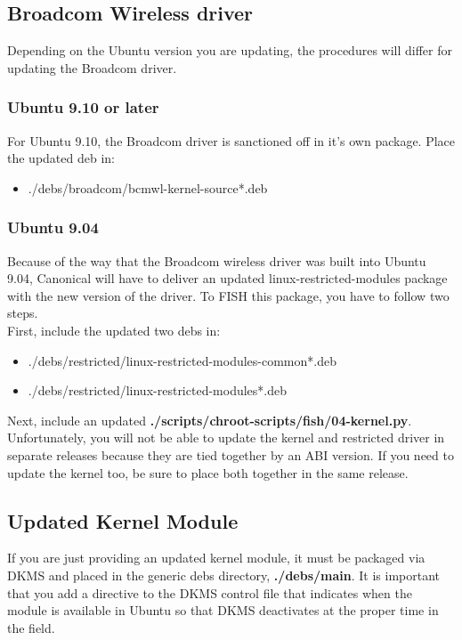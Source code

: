 \documentclass[letterpaper,10pt,titlepage]{article}
\begin{document}
\subsection{Broadcom Wireless driver}
Depending on the Ubuntu version you are updating, the procedures will differ for updating the Broadcom driver.

\subsubsection{Ubuntu 9.10 or later}
For Ubuntu 9.10, the Broadcom driver is sanctioned off in it's own package.  Place the updated deb in:
\begin{itemize}
\item ./debs/broadcom/bcmwl-kernel-source*.deb
\end{itemize}

\subsubsection{Ubuntu 9.04}
Because of the way that the Broadcom wireless driver was built into Ubuntu 9.04, Canonical will have to deliver an updated linux-restricted-modules package with the new version of the driver.  To FISH this package, you have to follow two steps.
\\
First, include the updated two debs in:
\begin{itemize}
\item ./debs/restricted/linux-restricted-modules-common*.deb
\item ./debs/restricted/linux-restricted-modules*.deb
\end{itemize}
Next, include an updated \textbf{./scripts/chroot-scripts/fish/04-kernel.py}.  Unfortunately, you will not be able to update the kernel and restricted driver in separate releases because they are tied together by an ABI version.  If you need to update the kernel too, be sure to place both together in the same release.

\subsection{Updated Kernel Module}
If you are just providing an updated kernel module, it must be packaged via DKMS and placed in the generic debs directory, \textbf{./debs/main}.  It is important that you add a directive to the DKMS control file that indicates when the module is available in Ubuntu so that DKMS deactivates at the proper time in the field.
\end{document}
